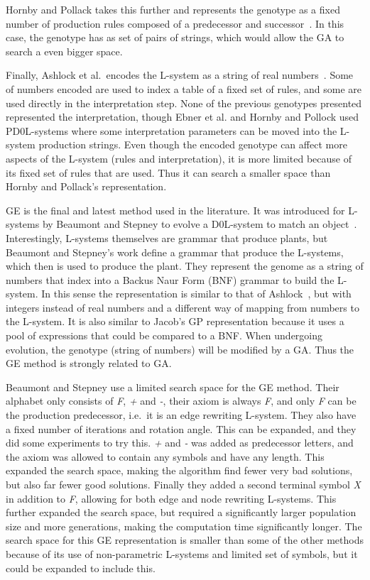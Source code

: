 Hornby and Pollack takes this further and represents the genotype as a fixed number of production rules composed of a predecessor and successor~\cite{2001Hornby}.
In this case, the genotype has as set of pairs of strings, which would allow the GA to search a even bigger space.

Finally, Ashlock et al.\ encodes the L-system as a string of real numbers~\cite{2006Ashlock}.
Some of numbers encoded are used to index a table of a fixed set of rules, and some are used directly in the interpretation step.
None of the previous genotypes presented represented the interpretation, though Ebner et al. and Hornby and Pollock used PD0L-systems where some interpretation parameters can be moved into the L-system production strings.
Even though the encoded genotype can affect more aspects of the L-system (rules and interpretation), it is more limited because of its fixed set of rules that are used.
Thus it can search a smaller space than Hornby and Pollack's representation.

GE is the final and latest method used in the literature.
It was introduced for L-systems by Beaumont and Stepney to evolve a D0L-system to match an object~\cite{2009Beaumont}.
Interestingly, L-systems themselves are grammar that produce plants, but Beaumont and Stepney's work define a grammar that produce the L-systems, which then is used to produce the plant.
They represent the genome as a string of numbers that index into a Backus Naur Form (BNF) grammar to build the L-system.
In this sense the representation is similar to that of Ashlock~\cite{2006Ashlock}, but with integers instead of real numbers and a different way of mapping from numbers to the L-system.
It is also similar to Jacob's GP representation because it uses a pool of expressions that could be compared to a BNF.
When undergoing evolution, the genotype (string of numbers) will be modified by a GA.
Thus the GE method is strongly related to GA.

Beaumont and Stepney use a limited search space for the GE method.
Their alphabet only consists of \textit{F}, \textit{+} and \textit{-}, their axiom is always \textit{F}, and only \textit{F} can be the production predecessor, i.e.\ it is an edge rewriting L-system.
They also have a fixed number of iterations and rotation angle.
This can be expanded, and they did some experiments to try this.
\textit{+} and \textit{-} was added as predecessor letters, and the axiom was allowed to contain any symbols and have any length.
This expanded the search space, making the algorithm find fewer very bad solutions, but also far fewer good solutions.
Finally they added a second terminal symbol \textit{X} in addition to \textit{F}, allowing for both edge and node rewriting L-systems.
This further expanded the search space, but required a significantly larger population size and more generations, making the computation time significantly longer.
The search space for this GE representation is smaller than some of the other methods because of its use of non-parametric L-systems and limited set of symbols, but it could be expanded to include this.

